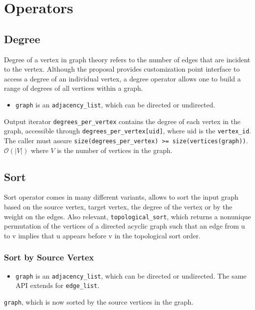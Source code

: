 \chapter{Operators}
\section{Degree}
Degree of a vertex in graph theory refers to the number of edges that are incident to the vertex. Although the proposal provides customization point interface to access a degree of an individual vertex, a degree operator allows one to build a range of degrees of all vertices within a graph.
{\small
      
}
\begin{itemdescr}
      \pnum\preconditions
      \begin{itemize}
            \item
                  \lstinline{graph} is an \lstinline{adjacency_list}, which can be directed or undirected. 
      \end{itemize}
      \pnum\effects Output iterator \lstinline{degrees_per_vertex} contains the degree of each vertex in the graph, accessible through \lstinline{degrees_per_vertex[uid]}, where uid is the \lstinline{vertex_id}. The caller must assure \lstinline{size(degrees_per_vertex) >= size(vertices(graph))}.
      \pnum\complexity $\mathcal{O}(|V|)$ where $V$ is the number of vertices in the graph.
\end{itemdescr}

\section{Sort}
Sort operator comes in many different variants, allows to sort the input graph based on the source vertex, target vertex, the degree of the vertex or by the weight on the edges. Also relevant, \lstinline{topological_sort}, which returns a nonunique permutation of the vertices of a directed acyclic graph such that an edge from u to v implies that u appears before v in the topological sort order.

\subsection{Sort by Source Vertex}
{\small
      
}
\begin{itemdescr}
    \pnum\preconditions
    \begin{itemize}
          \item
                \lstinline{graph} is an \lstinline{adjacency_list}, which can be directed or undirected. The same API extends for \lstinline{edge_list}.
    \end{itemize}
    \pnum\effects \lstinline{graph}, which is now sorted by the source vertices in the graph.
\end{itemdescr}

